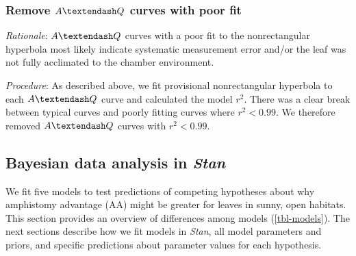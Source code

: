 \documentclass[
  letterpaper,
  DIV=11,
  numbers=noendperiod]{scrartcl}
\newcommand{\aax}{$\mathrm{AA}$}
\newcommand{\aqcurve}{$A \textendash Q$}
\begin{document}
\subsubsection{\texorpdfstring{Remove \aqcurve{} curves with poor
fit}{Remove  curves with poor fit}}\label{remove-curves-with-poor-fit}

\emph{Rationale}: \aqcurve{} curves with a poor fit to the
nonrectangular hyperbola most likely indicate systematic measurement
error and/or the leaf was not fully acclimated to the chamber
environment.

\emph{Procedure}: As described above, we fit provisional nonrectangular
hyperbola to each \aqcurve{} curve and calculated the model \(r^2\).
There was a clear break between typical curves and poorly fitting curves
where \(r^2 < 0.99\). We therefore removed \aqcurve{} curves with
\(r^2 < 0.99\).

\subsection{\texorpdfstring{Bayesian data analysis in
\emph{Stan}}{Bayesian data analysis in Stan}}\label{bayesian-data-analysis-in-stan}

We fit five models to test predictions of competing hypotheses about why
amphistomy advantage (\aax) might be greater for leaves in sunny, open
habitats. This section provides an overview of differences among models
(\autoref{tbl-models}). The next sections describe how we fit models in
\emph{Stan}, all model parameters and priors, and specific predictions
about parameter values for each hypothesis.
\end{document}
